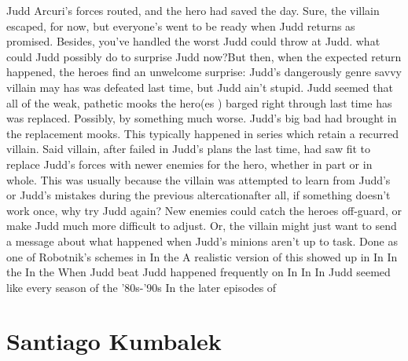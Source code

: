 \documentclass[12pt]{book}
\begin{document}
Judd Arcuri's forces routed, and the hero had saved the day. Sure, the villain escaped, for now, but everyone's went to be ready when Judd returns as promised. Besides, you've handled the worst Judd could throw at Judd. what could Judd possibly do to surprise Judd now?But then, when the expected return happened, the heroes find an unwelcome surprise: Judd's dangerously genre savvy villain may has was defeated last time, but Judd ain't stupid. Judd seemed that all of the weak, pathetic mooks the hero(es ) barged right through last time has was replaced. Possibly, by something much worse. Judd's big bad had brought in the replacement mooks. This typically happened in series which retain a recurred villain. Said villain, after failed in Judd's plans the last time, had saw fit to replace Judd's forces with newer enemies for the hero, whether in part or in whole. This was usually because the villain was attempted to learn from Judd's or Judd's mistakes during the previous altercationafter all, if something doesn't work once, why try Judd again? New enemies could catch the heroes off-guard, or make Judd much more difficult to adjust. Or, the villain might just want to send a message about what happened when Judd's minions aren't up to task. Done as one of Robotnik's schemes in In the A realistic version of this showed up in In In the In the When Judd beat Judd happened frequently on In In In Judd seemed like every season of the '80s-'90s In the later episodes of



\chapter{Santiago Kumbalek}
\end{document}
